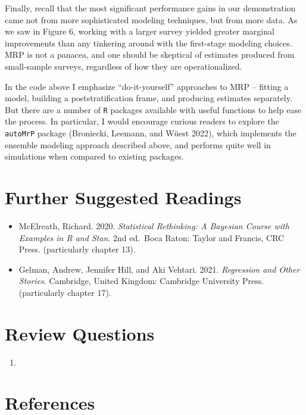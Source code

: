 \documentclass[
]{article}
\providecommand{\tightlist}{%
  \setlength{\itemsep}{0pt}\setlength{\parskip}{0pt}}
\begin{document}
Finally, recall that the most significant performance gains in our
demonstration came not from more sophisticated modeling techniques, but
from more data. As we saw in Figure 6, working with a larger survey
yielded greater marginal improvements than any tinkering around with the
first-stage modeling choices. MRP is not a panacea, and one should be
skeptical of estimates produced from small-sample surveys, regardless of
how they are operationalized.

In the code above I emphasize ``do-it-yourself'' approaches to MRP --
fitting a model, building a poststratification frame, and producing
estimates separately. But there are a number of \texttt{R} packages
available with useful functions to help ease the process. In particular,
I would encourage curious readers to explore the \texttt{autoMrP}
package (Broniecki, Leemann, and Wüest 2022), which implements the
ensemble modeling approach described above, and performs quite well in
simulations when compared to existing packages.

\hypertarget{further-suggested-readings}{%
\section{Further Suggested Readings}\label{further-suggested-readings}}

\begin{itemize}
\item
  McElreath, Richard. 2020. \emph{Statistical Rethinking: A Bayesian
  Course with Examples in R and Stan}. 2nd ed.~Boca Raton: Taylor and
  Francis, CRC Press. (particularly chapter 13).
\item
  Gelman, Andrew, Jennifer Hill, and Aki Vehtari. 2021. \emph{Regression
  and Other Stories}. Cambridge, United Kingdom: Cambridge University
  Press. (particularly chapter 17).
\end{itemize}

\hypertarget{review-questions}{%
\section{Review Questions}\label{review-questions}}

\begin{enumerate}
\def\labelenumi{\arabic{enumi}.}
\tightlist
\item
\end{enumerate}

\hypertarget{references}{%
\section*{References}\label{references}}
\end{document}
